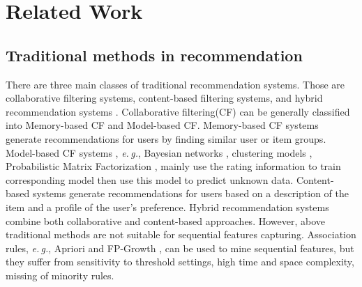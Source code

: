 \documentclass[runningheads]{llncs}
\begin{document}
\section{Related Work}
\subsection{Traditional methods in recommendation}

There are three main classes of traditional recommendation systems. Those are collaborative filtering systems, content-based filtering systems, and hybrid recommendation systems \cite{1423975}. Collaborative filtering(CF) can be generally classified into Memory-based \cite{Resnick:1994:GOA:192844.192905,sarwar2001item} CF and Model-based \cite{chien1999bayesian,ungar1998clustering,mnih2008probabilistic} CF. Memory-based CF \cite{Resnick:1994:GOA:192844.192905,sarwar2001item,chien1999bayesian,ungar1998clustering} systems generate recommendations for users by finding similar user or item groups. Model-based CF systems , \emph{e.\,g.}, Bayesian networks \cite{chien1999bayesian}, clustering models \cite{ungar1998clustering}, Probabilistic Matrix Factorization \cite{mnih2008probabilistic}, mainly use the rating information to train corresponding model then use this model to predict unknown data. Content-based systems \cite{balabanovic1997fab} generate recommendations for users based on a description of the item and a profile of the user's preference. Hybrid recommendation systems \cite{burke2002hybrid} combine both collaborative and content-based approaches. However, above traditional methods are not suitable for sequential features capturing. Association rules, \emph{e.\,g.}, Apriori \cite{agrawal1993mining} and FP-Growth \cite{li2008pfp}, can be used to mine sequential features, but they suffer from sensitivity to threshold settings, high time and space complexity, missing of minority rules.
\end{document}
